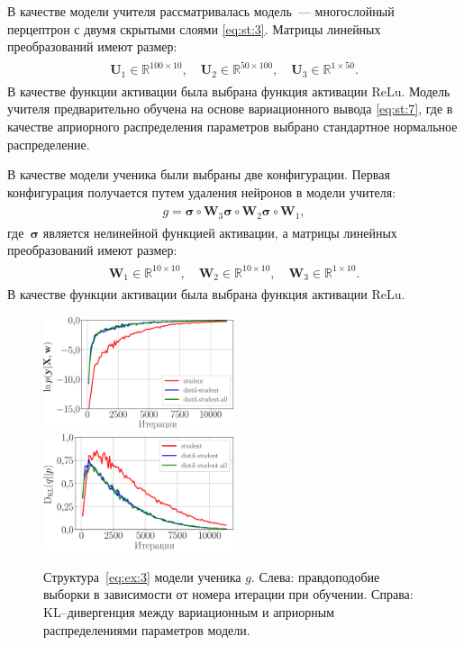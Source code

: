\documentclass[12pt]{a&t}
\begin{document}
В качестве модели учителя рассматривалась модель~--- многослойный перцептрон с двумя скрытыми слоями \eqref{eq:st:3}. Матрицы линейных преобразований имеют размер:
\begin{gather}
\label{eq:ex:2}
\begin{aligned}
\mathbf{U}_{1} \in \mathbb{R}^{100 \times 10}, \quad \mathbf{U}_{2} \in \mathbb{R}^{50 \times 100}, \quad \mathbf{U}_{3} \in \mathbb{R}^{1 \times 50}.
\end{aligned}
\end{gather}
В качестве функции активации была выбрана функция активации $\text{ReLu}$.
Модель учителя предварительно обучена на основе вариационного вывода \eqref{eq:st:7}, где в качестве априорного распределения параметров выбрано стандартное нормальное распределение.

В качестве модели ученика были выбраны две конфигурации. Первая конфигурация получается путем удаления нейронов в модели учителя:
\begin{gather}
\label{eq:ex:3}
\begin{aligned}
g = \bm{\sigma} \circ \mathbf{W}_3\bm{\sigma} \circ \mathbf{W}_2\bm{\sigma} \circ \mathbf{W}_1,
\end{aligned}
\end{gather}
где~$\bm{\sigma}$ является нелинейной функцией активации, а матрицы линейных преобразований имеют размер:
\begin{gather}
\label{eq:ex:4}
\begin{aligned}
\mathbf{W}_{1} \in \mathbb{R}^{10 \times 10}, \quad \mathbf{W}_{2} \in \mathbb{R}^{10 \times 10},  \quad \mathbf{W}_{3} \in \mathbb{R}^{1 \times 10}.
\end{aligned}
\end{gather}
В качестве функции активации была выбрана функция активации $\text{ReLu}$.

\begin{figure}[h!]
\includegraphics[width=0.5\textwidth]{synthetic_likelihood_3_layers.eps}
\includegraphics[width=0.5\textwidth]{synthetic_D_KL_3_layers.eps}
\caption{Структура~\eqref{eq:ex:3} модели ученика $g$. Слева: правдоподобие выборки в зависимости от номера итерации при обучении. Справа: KL--дивергенция между вариационным и априорным распределениями параметров модели.}
\label{exp:fig1}
\end{figure}
\end{document}

